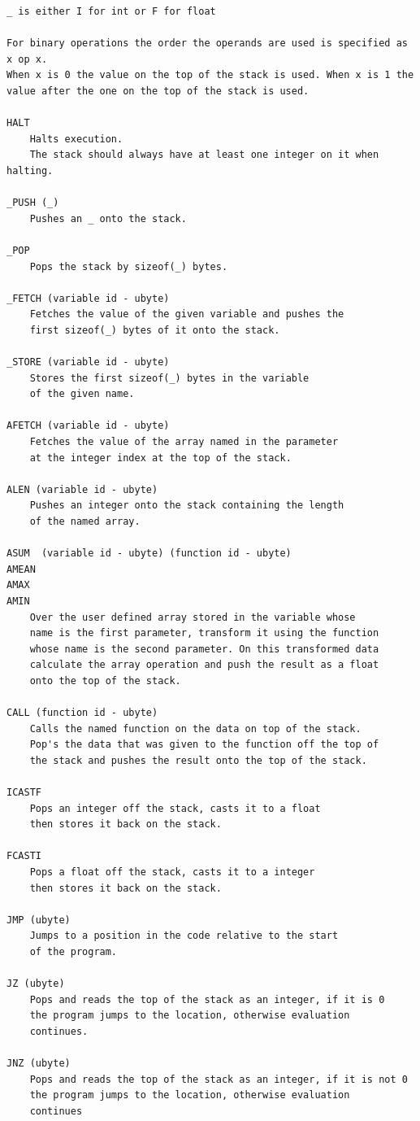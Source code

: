 \begin{verbatim}
_ is either I for int or F for float

For binary operations the order the operands are used is specified as x op x.
When x is 0 the value on the top of the stack is used. When x is 1 the
value after the one on the top of the stack is used.

HALT
    Halts execution.
    The stack should always have at least one integer on it when halting.

_PUSH (_)
    Pushes an _ onto the stack.

_POP
    Pops the stack by sizeof(_) bytes.

_FETCH (variable id - ubyte)
    Fetches the value of the given variable and pushes the
    first sizeof(_) bytes of it onto the stack.

_STORE (variable id - ubyte)
    Stores the first sizeof(_) bytes in the variable
    of the given name.

AFETCH (variable id - ubyte)
    Fetches the value of the array named in the parameter
    at the integer index at the top of the stack.

ALEN (variable id - ubyte)
    Pushes an integer onto the stack containing the length
    of the named array.
	
ASUM  (variable id - ubyte) (function id - ubyte)
AMEAN
AMAX
AMIN
    Over the user defined array stored in the variable whose
    name is the first parameter, transform it using the function
    whose name is the second parameter. On this transformed data
    calculate the array operation and push the result as a float
    onto the top of the stack.

CALL (function id - ubyte)
    Calls the named function on the data on top of the stack.
    Pop's the data that was given to the function off the top of
    the stack and pushes the result onto the top of the stack.

ICASTF
    Pops an integer off the stack, casts it to a float
    then stores it back on the stack.

FCASTI
    Pops a float off the stack, casts it to a integer
    then stores it back on the stack.

JMP (ubyte)
    Jumps to a position in the code relative to the start
    of the program.

JZ (ubyte)
    Pops and reads the top of the stack as an integer, if it is 0
    the program jumps to the location, otherwise evaluation
    continues.

JNZ (ubyte)
    Pops and reads the top of the stack as an integer, if it is not 0
    the program jumps to the location, otherwise evaluation
    continues


\end{verbatim}
